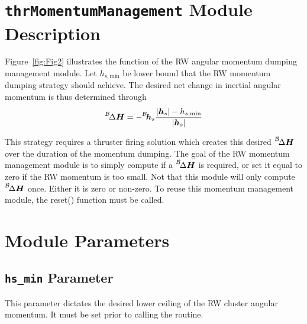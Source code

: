 \documentclass[]{BasiliskReportMemo}
\begin{document}
\section{{\tt thrMomentumManagement}  Module Description}
Figure~\ref{fig:Fig2} illustrates the function of the RW angular momentum dumping management module.  Let $h_{s,\text{min}}$ be lower bound that the RW momentum dumping strategy should achieve.  The desired net change in inertial angular momentum is thus determined through
\begin{equation}
	\leftexp{B}{\Delta}\bm H = -\leftexp{B}{\bm h}_{s} \frac{
		|\bm h_{s}| - h_{s,\text{min}}
	}{|\bm h_{s}|} 
\end{equation}

This strategy requires a thruster firing solution which creates this desired $\leftexp{B}{\Delta}\bm H$ over the duration of the momentum dumping.  The goal of the RW momentum management module is to simply compute if a $\leftexp{B}{\Delta}\bm H$ is required, or set it equal to zero if the RW momentum is too small.  Not that this module will only compute $\leftexp{B}{\Delta}\bm H$ once.  Either it is zero or non-zero.  To reuse this momentum management module, the reset() function must be called.




\section{Module Parameters}
\subsection{{\tt hs\_min} Parameter}
This parameter dictates the desired lower ceiling of the RW cluster angular momentum.  It must be set prior to calling the routine.  
\end{document}
